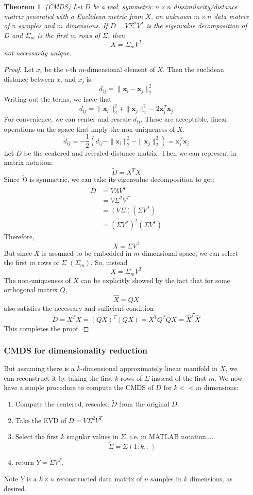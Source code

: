 \documentclass[11pt]{article}
\newtheorem{theorem}{Theorem}[section]
\begin{document}
\begin{theorem}
\emph{(CMDS)}
\label{CMDS}
Let $D$ be a real, symmetric $n \times n$ dissimilarity/distance matrix generated with a Euclidean metric from $X$, an unknown $m \times n$ data matrix of $n$ samples and $m$ dimensions. If $D=V \Sigma^2 V^T$ is the eigenvalue decomposition of $D$ and $\Sigma_m$ is the first $m$ rows of $\Sigma$, then
\[X = \Sigma_m V^T\]
not necessarily unique.
\end{theorem}
\begin{proof}
Let $x_i$ be the $i$-th $m$-dimensional element of $X$. Then the euclidean distance between $x_i$ and $x_j$ is:
\[d_{ij} = \| \mathbf{x}_i - \mathbf{x}_j \|_2^2\]
Writing out the terms, we have that
\[d_{ij} = \|\mathbf{x}_i\|_2^2 + \|\mathbf{x}_j\|_2^2 - 2 \mathbf{x}_i^T\mathbf{x}_j\]
For convenience, we can center and rescale $d_{ij}$. These are acceptable, linear operations on the space that imply the non-uniqueness of $X$.
\[\tilde d_{ij} = -\frac{1}{2} \left( d_{ij} - \|\mathbf{x}_i\|_2^2 - \|\mathbf{x}_j\|_2^2 \right) = \mathbf{x}_i^T\mathbf{x}_j \]
Let $\tilde D$ be the centered and rescaled distance matrix. Then we can represent in matrix notation:
\[\tilde D = X^TX\]
Since $\tilde D$ is symmetric, we can take its eigenvalue decomposition to get:
\begin{align*}
\tilde D &= V \Lambda V^T \\
&= V \Sigma^2 V^T \\
&= (V \Sigma ) (\Sigma V^T) \\
&= (\Sigma V^T)^T (\Sigma V^T)
\end{align*}
Therefore,
\[X = \Sigma V^T\]
But since $X$ is assumed to be embedded in $m$ dimensional space, we can select the first $m$ rows of $\Sigma$ $(\Sigma_m)$. So, instead
\[X = \Sigma_m V^T\]
The non-uniqueness of $X$ can be explicitly showed by the fact that for some orthogonal matrix $Q$,
\[\hat X = QX\]
also satisfies the necessary and sufficient condition
\[D = X^TX = (QX)^T(QX) = X^TQ^TQX = \hat X^T\hat X \]
This completes the proof.
\end{proof}

\subsubsection*{CMDS for dimensionality reduction}
But assuming there is a $k$-dimensional approximately linear manifold in $X$, we can reconstruct it by taking the first $k$ rows of $\Sigma$ instead of the first $m$. We now have a simple procedure to compute the CMDS of $D$ for $k << m$ dimensions:
\begin{enumerate}
\item Compute the centered, rescaled $\tilde D$ from the original $D$.
\item Take the EVD of $D = V \Sigma^2 V^T$
\item Select the first $k$ singular values in $\Sigma$, i.e. in MATLAB notation....
\[\tilde \Sigma = \Sigma(1:k, :)\]
\item return $Y = \tilde \Sigma V^T$.
\end{enumerate}
Note $Y$ is a $k \times n$ reconstructed data matrix of $n$ samples in $k$ dimensions, as desired.
\end{document}
